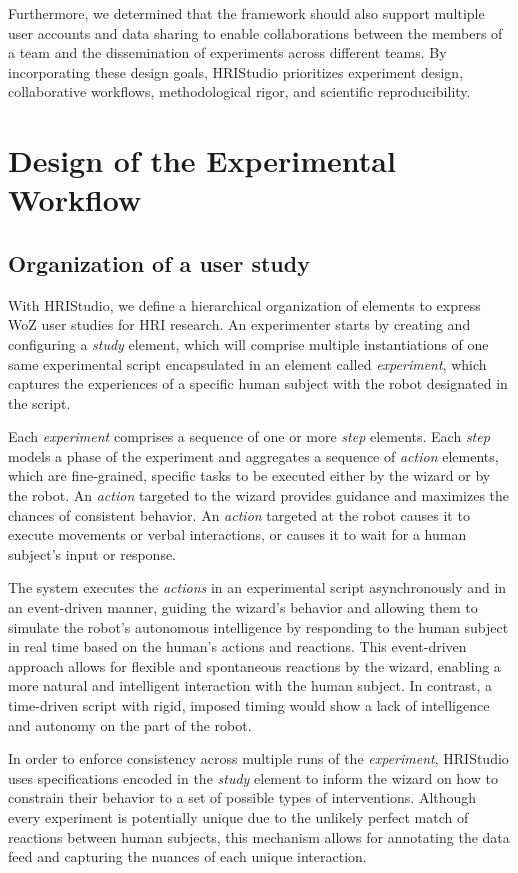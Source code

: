 \documentclass[letterpaper, 10 pt, conference]{ieeeconf}
\begin{document}
Furthermore, we determined that the framework should also support multiple user accounts and data sharing to enable collaborations between the members of a team and the dissemination of experiments across different teams. By incorporating these design goals, HRIStudio prioritizes experiment design, collaborative workflows, methodological rigor, and scientific reproducibility.

\section{Design of the Experimental Workflow}

\subsection{Organization of a user study}

With HRIStudio, we define a hierarchical organization of elements to express WoZ user studies for HRI research. An experimenter starts by creating and configuring a \emph{study} element, which will comprise multiple instantiations of one same experimental script encapsulated in an element called \emph{experiment}, which captures the experiences of a specific human subject with the robot designated in the script. 

Each \emph{experiment} comprises a sequence of one or more \emph{step} elements. Each \emph{step} models a phase of the experiment and aggregates a sequence of \emph{action} elements, which are fine-grained, specific tasks to be executed either by the wizard or by the robot. An \emph{action} targeted to the wizard provides guidance and maximizes the chances of consistent behavior. An \emph{action} targeted at the robot causes it to execute movements or verbal interactions, or causes it to wait for a human subject's input or response.

The system executes the \emph{actions} in an experimental script asynchronously and in an event-driven manner, guiding the wizard's behavior and allowing them to simulate the robot's autonomous intelligence by responding to the human subject in real time based on the human's actions and reactions. This event-driven approach allows for flexible and spontaneous reactions by the wizard, enabling a more natural and intelligent interaction with the human subject. In contrast, a time-driven script with rigid, imposed timing would show a lack of intelligence and autonomy on the part of the robot.

In order to enforce consistency across multiple runs of the \emph{experiment}, HRIStudio uses specifications encoded in the \emph{study} element to inform the wizard on how to constrain their behavior to a set of possible types of interventions. Although every experiment is potentially unique due to the unlikely perfect match of reactions between human subjects, this mechanism allows for annotating the data feed and capturing the nuances of each unique interaction.
\end{document}
